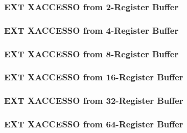 \subsubsection[{\small EXT XACCESSO from 2-Register Buffer}]{EXT XACCESSO from 2-Register Buffer} \label{sec:format-EXT-XACCESSO2}



\subsubsection[{\small EXT XACCESSO from 4-Register Buffer}]{EXT XACCESSO from 4-Register Buffer} \label{sec:format-EXT-XACCESSO4}



\subsubsection[{\small EXT XACCESSO from 8-Register Buffer}]{EXT XACCESSO from 8-Register Buffer} \label{sec:format-EXT-XACCESSO8}



\subsubsection[{\small EXT XACCESSO from 16-Register Buffer}]{EXT XACCESSO from 16-Register Buffer} \label{sec:format-EXT-XACCESSO16}



\subsubsection[{\small EXT XACCESSO from 32-Register Buffer}]{EXT XACCESSO from 32-Register Buffer} \label{sec:format-EXT-XACCESSO32}



\subsubsection[{\small EXT XACCESSO from 64-Register Buffer}]{EXT XACCESSO from 64-Register Buffer} \label{sec:format-EXT-XACCESSO64}

